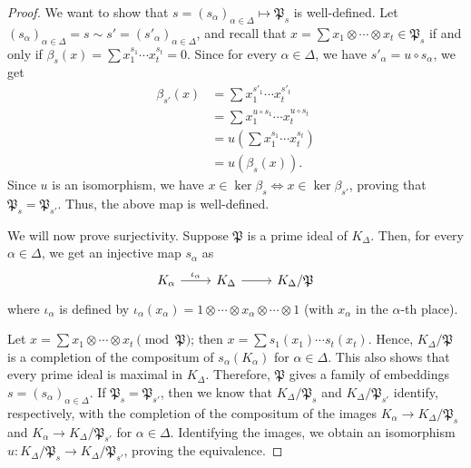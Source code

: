 \documentclass[12pts,a4paper]{amsart}
\begin{document}
\begin{proof}
    We want to show that $s=(s_\alpha)_{\alpha\in\Delta} \mapsto \mathfrak{P}_s$ is well-defined. Let $(s_\alpha)_{\alpha\in\Delta}=s \sim s'=(s'_\alpha)_{\alpha\in\Delta}$, and recall that $x = \sum x_1 \otimes \cdots \otimes x_t \in \mathfrak{P}_s$ if and only if $\beta_s(x) = \sum x^{s_1}_1 \cdots x^{s_t}_t = 0$. Since for every $\alpha \in \Delta$, we have $s'_\alpha = u \circ s_\alpha$, we get
\begin{align*}
    \beta_{s'}(x) &= \sum x^{s'_1}_1 \cdots x^{s'_t}_t \\
                  &= \sum x^{u \circ s_1}_1 \cdots x^{u \circ s_t}_t \\
                  &= u\left(\sum x^{s_1}_1 \cdots x^{s_t}_t\right) \\
                  &= u(\beta_s(x)).
\end{align*}
Since $u$ is an isomorphism, we have $x \in \ker \beta_s \iff x \in \ker \beta_{s'}$, proving that $\mathfrak{P}_s = \mathfrak{P}_{s'}$. Thus, the above map is well-defined.

We will now prove surjectivity. Suppose $\mathfrak{P}$ is a prime ideal of $K_\Delta$. Then, for every $\alpha \in \Delta$, we get an injective map $s_\alpha$ as
\[
\begin{tikzcd}
    K_\alpha \arrow[r, "\iota_\alpha"] & K_\Delta \arrow[r] & K_\Delta / \mathfrak{P}
\end{tikzcd}
\]
where $\iota_\alpha$ is defined by $\iota_\alpha(x_\alpha) = 1 \otimes \cdots \otimes x_\alpha \otimes \cdots \otimes 1$ (with $x_\alpha$ in the $\alpha$-th place).

Let $x = \sum x_1 \otimes \cdots \otimes x_t \pmod{\mathfrak{P}}$; then $x = \sum s_1(x_1) \cdots s_t(x_t)$. Hence, $K_\Delta / \mathfrak{P}$ is a completion of the compositum of $s_\alpha(K_\alpha)$ for $\alpha \in \Delta$. This also shows that every prime ideal is maximal in $K_\Delta$. Therefore, $\mathfrak{P}$ gives a family of embeddings $s=(s_\alpha)_{\alpha\in\Delta}$. If $\mathfrak{P}_s=\mathfrak{P}_{s'}$, then we know that $K_\Delta/\mathfrak{P}_s$ and $K_\Delta/\mathfrak{P}_{s'}$ identify, respectively, with the completion of the compositum of the images $K_\alpha\to K_\Delta/\mathfrak{P}_s$ and $K_\alpha\to K_\Delta/\mathfrak{P}_{s'}$ for $\alpha\in\Delta$. Identifying the images, we obtain an isomorphism $u:K_\Delta/\mathfrak{P}_s\to K_\Delta/\mathfrak{P}_{s'}$, proving the equivalence.
\end{proof}
\end{document}
